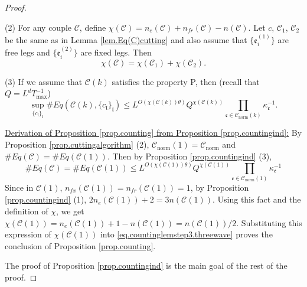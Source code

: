 \begin{proof}
\begin{prop}
(2) For any couple $\mathcal{C}$, define $\chi(\mathcal{C})=n_e(\mathcal{C})+n_{\textit{fr}}(\mathcal{C})-n(\mathcal{C})$. Let $c$, $\mathcal{C}_1$, $\mathcal{C}_2$ be the same as in Lemma \ref{lem.Eq(C)cutting} and also assume that $\{\mathfrak{e}_{i}^{(1)}\}$ are free legs and $\{\mathfrak{e}_{i}^{(2)}\}$ are fixed legs. Then 
\begin{equation}
    \chi(\mathcal{C})=\chi(\mathcal{C}_1)+\chi(\mathcal{C}_2).
\end{equation}

(3) If we assume that $\mathcal{C}(k)$ satisfies the property P, then (recall that $Q=L^{d}T^{-1}_{\text{max}}$)
\begin{equation}\label{eq.countingbd3.threewave}
\sup_{\{c_{\mathfrak{l}}\}_{\mathfrak{l}}}\#Eq(\mathcal{C}(k),\{c_{\mathfrak{l}}\}_{\mathfrak{l}})\leq L^{O\left(\chi(\mathcal{C}(k))\theta\right)} Q^{\chi(\mathcal{C}(k))}\prod_{\mathfrak{e}\in \mathcal{C}_{\text{norm}}(k)} \kappa^{-1}_{\mathfrak{e}} .
\end{equation}

\end{prop}

\underline{Derivation of Proposition \ref{prop.counting} from Proposition \ref{prop.countingind}:} 
By Proposition \ref{prop.cuttingalgorithm} (2), $\mathcal{C}_{\text{norm}}(1)=\mathcal{C}_{\text{norm}}$ and $\# Eq(\mathcal{C})=\# Eq(\mathcal{C}(1))$. Then by Proposition \ref{prop.countingind} (3), 
\begin{equation}\label{eq.countinglemstep3.threewave}
    \# Eq(\mathcal{C})=\# Eq(\mathcal{C}(1))\leq L^{O(\chi(\mathcal{C}(1))\theta)} Q^{\chi(\mathcal{C}(1))}\prod_{\mathfrak{e}\in \mathcal{C}_{\text{norm}}(1)} \kappa^{-1}_{\mathfrak{e}}
\end{equation}
Since in $\mathcal{C}(1)$, $n_{fx}(\mathcal{C}(1))=n_{\textit{fr}}(\mathcal{C}(1))=1$, by Proposition \ref{prop.countingind} (1), $2n_e(\mathcal{C}(1))+2=3n(\mathcal{C}(1))$. Using this fact and the definition of $\chi$, we get $\chi(\mathcal{C}(1))=n_e(\mathcal{C}(1))+1-n(\mathcal{C}(1))=n(\mathcal{C}(1))/2$. Substituting this expression of $\chi(\mathcal{C}(1))$ into \eqref{eq.countinglemstep3.threewave} proves the conclusion of Proposition \ref{prop.counting}. 

The proof of Proposition \ref{prop.countingind} is the main goal of the rest of the proof.



\end{proof}
